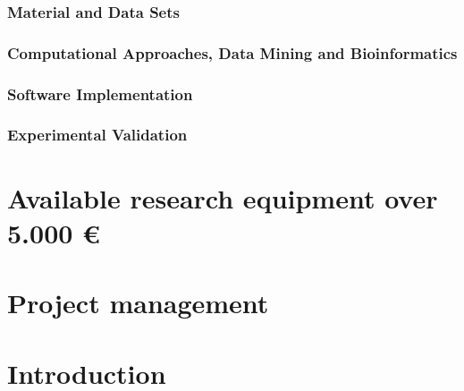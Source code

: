 \documentclass[11pt,a4paper]{article}
\begin{document}
\subsubsection{Material and Data Sets}
\subsubsection{Computational Approaches, Data Mining and Bioinformatics}
\subsubsection{Software Implementation}
\subsubsection{Experimental Validation}

\section{Available research equipment over 5.000 €}

\section{Project management}

\section{Introduction}
\end{document}
